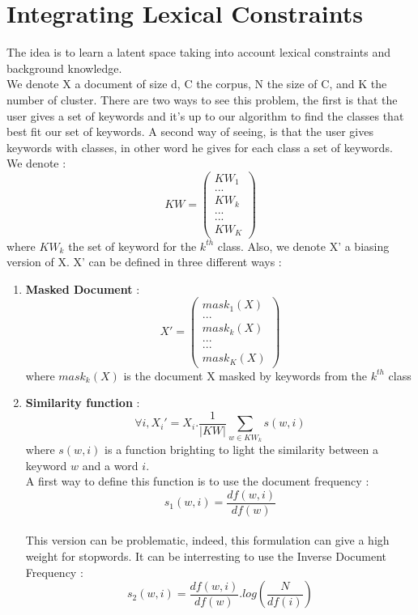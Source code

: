 \section{Integrating Lexical Constraints}
The idea is to learn a latent space taking into account lexical constraints and
background knowledge.
\\We denote  X a document of size d,
C the corpus, N the size of C, and K the number of cluster.
There are two ways to see this problem, the first is that the user gives a set 
of keywords and it's up to our algorithm to find the classes that best fit our 
set of keywords. A second way of seeing, is that the user gives keywords with 
classes, in other word he gives for each class a set of keywords.\\
We denote :
\begin{equation}
KW = \begin{pmatrix}KW_1  \\ ... \\ KW_k \\ ...\\ ... \\ KW_{K}\end{pmatrix}
\end{equation}
where $KW_k$ the set of keyword for the $k^{th}$ class. Also, we denote X' a biasing
version of X. X' can be defined in three different ways :
\begin{enumerate}
\item \textbf{Masked Document} :
\begin{equation}
X' = \begin{pmatrix}mask_1(X)  \\ ... \\ mask_k(X) \\ ...\\ ... \\ mask_K(X)\end{pmatrix}
\end{equation}
where $mask_k(X)$ is the document X masked by keywords from the $k^{th}$ class
\item \textbf{Similarity function} :
\begin{equation}
\forall i, X_i' = X_i . \frac{1}{|KW|} \sum\limits_{w \in KW_k} s(w,i)
\end{equation}
where $s(w,i)$ is a function brighting to light the similarity between a keyword $w$ and a word $i$.
\\A first way to define this function is to use the document frequency :
\begin{equation}\label{sim_1}
s_1(w,i) = \frac{df(w,i)}{df(w)}
\end{equation}
\\This version can be problematic, indeed, this formulation can give a high weight
for stopwords. It can be interresting to use the Inverse Document Frequency :
\begin{equation}\label{sim_2}
s_2(w,i) = \frac{df(w,i)}{df(w)} . log\left(\frac{N}{df(i)}\right)
\end{equation}
\end{enumerate}
